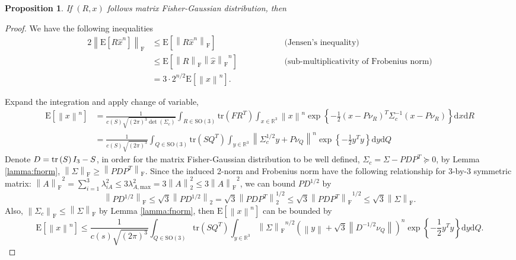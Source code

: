 \documentclass[10pt]{article}
\newtheorem{proposition}{Proposition}
\newcommand{\norm}[1]{\ensuremath{\left\| #1 \right\|}}
\newcommand{\fnorm}[1]{\ensuremath{\left\| #1 \right\|_\mathrm{F}}}
\newcommand{\tr}[1]{\ensuremath{\mathrm{tr}\left( #1 \right)}}
\newcommand{\expect}[1]{\ensuremath{\mathrm{E}\left[ #1 \right]}}
\newcommand{\SO}{\ensuremath{\mathrm{SO(3)}}}
\newcommand{\real}[1]{\ensuremath{\mathbb{R}^{ #1 }}}
\newcommand{\diff}[1]{\ensuremath{\mathrm{d} #1}}
\begin{document}
\begin{proposition}
	If $(R,x)$ follows matrix Fisher-Gaussian distribution, then 
\end{proposition}
\begin{proof}
	We have the following inequalities
	\begin{alignat*}{2}
		\fnorm{\expect{R\hat{x}^n}} &\leq \expect{\fnorm{R\hat{x}^n}} \qquad \qquad &&\text{(Jensen's inequality)} \nonumber \\
		&\leq \expect{\fnorm{R}\fnorm{\hat{x}}^n} \qquad \qquad &&\text{(sub-multiplicativity of Frobenius norm)} \nonumber \\
		&= 3\cdot 2^{n/2} \expect{\norm{x}^n}.
	\end{alignat*}
	
	Expand the integration and apply change of variable,
	\begin{align*}
		\expect{\norm{x}^n} &= \frac{1}{c(S)\sqrt{(2\pi)^3\det(\Sigma_c)}} \int_{R\in\SO}\tr{FR^T}\int_{x\in\real{3}}\norm{x}^n\exp\left\{-\frac{1}{2}(x-P\nu_R)^T\Sigma_c^{-1}(x-P\nu_R)\right\}\diff{x}\diff{R} \\
		&= \frac{1}{c(S)\sqrt{(2\pi)^3}} \int_{Q\in\SO}\tr{SQ^T}\int_{y\in\real{3}}\norm{\Sigma_c^{1/2}y+P\nu_Q}^n\exp\left\{-\frac{1}{2}y^Ty\right\}\diff{y}\diff{Q}
	\end{align*}
	Denote $D = \tr{S}I_{3\time 3}-S$, in order for the matrix Fisher-Gaussian distribution to be well defined, $\Sigma_c=\Sigma-PDP^T\succeq 0$, by Lemma \ref{lamma:fnorm}, $\fnorm{\Sigma} \geq \fnorm{PDP^T}$.
	Since the induced 2-norm and Frobenius norm have the following relationship for 3-by-3 symmetric matrix: $\fnorm{A}^2 = \sum_{i=1}^3\lambda_{iA}^2 \leq 3\lambda_{A,\mathrm{max}}^2 = 3\norm{A}_2^2 \leq 3\fnorm{A}^2$, we can bound $PD^{1/2}$ by
	\begin{equation*}
		\fnorm{PD^{1/2}} \leq \sqrt{3}\norm{PD^{1/2}}_2 = \sqrt{3}\norm{PDP^T}^{1/2}_2 \leq \sqrt{3}\fnorm{PDP^T}^{1/2} \leq \sqrt{3}\fnorm{\Sigma}.
	\end{equation*}
	Also, $\fnorm{\Sigma_c}\leq\fnorm{\Sigma}$ by Lemma \ref{lamma:fnorm}, then $\expect{\norm{x}^n}$ can be bounded by
	\begin{equation*}
		\expect{\norm{x}^n} \leq \frac{1}{c(s)\sqrt{(2\pi)^3}}\int_{Q\in\SO}\tr{SQ^T}\int_{y\in\real{3}}\fnorm{\Sigma}^{n/2}\left(\norm{y}+\sqrt{3}\norm{D^{-1/2}\nu_Q}\right)^n\exp\left\{-\frac{1}{2}y^Ty\right\}\diff{y}\diff{Q}.
	\end{equation*}
\end{proof}
\end{document}
